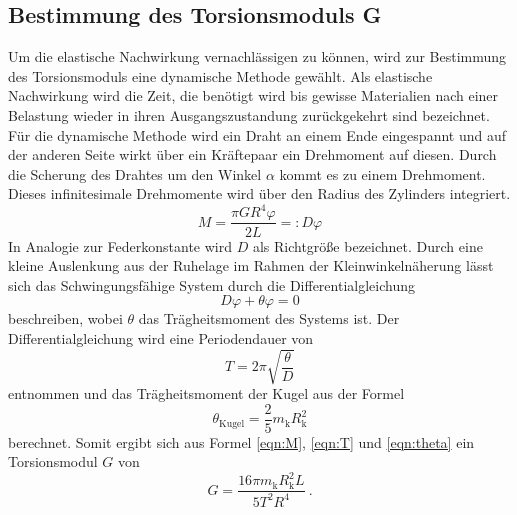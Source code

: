 \subsection{Bestimmung des Torsionsmoduls G}
Um die elastische Nachwirkung vernachlässigen zu können, wird zur Bestimmung des Torsionsmoduls eine dynamische Methode gewählt. Als elastische Nachwirkung wird die Zeit, die benötigt wird bis gewisse Materialien nach einer Belastung wieder in ihren Ausgangszustandung zurückgekehrt sind bezeichnet.
Für die dynamische Methode wird ein Draht an einem Ende eingespannt und auf der anderen Seite wirkt über ein Kräftepaar ein Drehmoment auf diesen. Durch die Scherung des Drahtes um den Winkel $\alpha$ kommt es zu einem Drehmoment. Dieses infinitesimale Drehmomente wird über den Radius des Zylinders integriert.
\begin{equation}
  M = \frac{\pi G R^4 \varphi}{2L} =: D \varphi
  \label{eqn:M}
\end{equation}
In Analogie zur Federkonstante wird $D$ als Richtgröße bezeichnet. Durch eine kleine Auslenkung aus der Ruhelage im Rahmen der Kleinwinkelnäherung lässt sich das Schwingungsfähige System durch die Differentialgleichung
\begin{equation}
  D \varphi + \theta \varphi = 0
  \label{eqn:dgl}
\end{equation}
beschreiben, wobei $\theta$ das Trägheitsmoment des Systems ist. Der Differentialgleichung wird eine Periodendauer von
\begin{equation}
  T = 2 \pi \sqrt{\frac{\theta}{D}}
  \label{eqn:T}
\end{equation}
entnommen und das Trägheitsmoment der Kugel aus der Formel
\begin{equation}
  \theta_\text{Kugel} = \frac{2}{5}m_\text{k}R_\text{k}^2
  \label{eqn:theta}
\end{equation}
berechnet. Somit ergibt sich aus Formel \ref{eqn:M}, \ref{eqn:T} und \ref{eqn:theta} ein Torsionsmodul $G$ von
\begin{equation}
  G = \frac{16 \pi m_\text{k} R_\text{k}^2 L}{5 T^2 R^4} \ .
  \label{eqn:G}
\end{equation}
